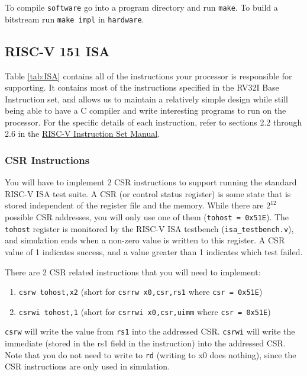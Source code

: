 \documentclass[11pt]{article}
\begin{document}
To compile \texttt{software} go into a program directory and run \texttt{make}.
To build a bitstream run \texttt{make impl} in \texttt{hardware}.

\subsection{RISC-V 151 ISA}
Table \ref{tab:ISA} contains all of the instructions your processor is responsible for supporting.
It contains most of the instructions specified in the RV32I Base Instruction set, and allows us to maintain a relatively simple design while still being able to have a C compiler and write interesting programs to run on the processor.
For the specific details of each instruction, refer to sections 2.2 through 2.6 in the \href{http://riscv.org/specifications/}{RISC-V Instruction Set Manual}.

\subsubsection{CSR Instructions}
You will have to implement 2 CSR instructions to support running the standard RISC-V ISA test suite.
A CSR (or control status register) is some state that is stored independent of the register file and the memory.
While there are $2^{12}$ possible CSR addresses, you will only use one of them (\texttt{tohost = 0x51E}).
The \texttt{tohost} register is monitored by the RISC-V ISA testbench (\verb|isa_testbench.v|), and simulation ends when a non-zero value is written to this register.
A CSR value of 1 indicates success, and a value greater than 1 indicates which test failed.

There are 2 CSR related instructions that you will need to implement:
\begin{enumerate}
  \item \texttt{csrw tohost,x2}  (short for \texttt{csrrw x0,csr,rs1} where \texttt{csr = 0x51E})
  \item \texttt{csrwi tohost,1}  (short for \texttt{csrrwi x0,csr,uimm} where \texttt{csr = 0x51E})
\end{enumerate}

\texttt{csrw} will write the value from \texttt{rs1} into the addressed CSR.
\texttt{csrwi} will write the immediate (stored in the rs1 field in the instruction) into the addressed CSR.
Note that you do not need to write to \texttt{rd} (writing to x0 does nothing), since the CSR instructions are only used in simulation.


\end{document}
